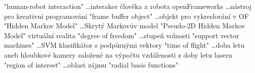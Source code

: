 
\abbrv[HRI]	"human-robot interaction" \dots interakce člověka a robota
\abbrv[OF]	openFrameworks \dots nástroj pro kreativní programování
\abbrv[FBO]  "frame buffer object" \dots objekt pro vykreslování v OF
\abbrv[HMM]  "Hidden Markov Model" \dots Skrytý Markovův model
\abbrv[P2DHMM]  "Pseudo-2D Hidden Markov Model"
\abbrv[VR]  virtuální realita
\abbrv[DOF]  "degree of freedom" \dots stupeň volnosti
\abbrv[SVM]  "support vector machines" \dots SVM klasifikátor s podpůrnými vektory
\abbrv[TOF]  "time of flight" \dots doba letu aneb hloubkové kamery založené na výpočtu vzdálenosti z doby letu laseru
\abbrv[ROI]  "region of interest" \dots oblast zájmu
\abbrv[RBF]  "radial basis functions"

\stopAbbreviations

\endinput
